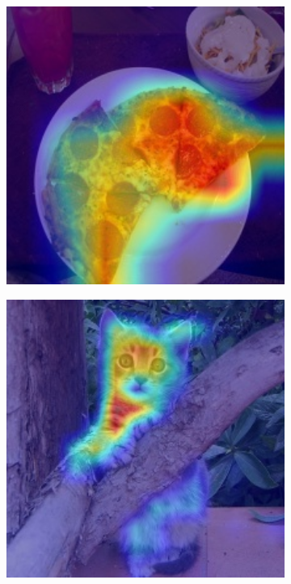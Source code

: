 \begin{figure}[t]
\begin{subfigure}[b]{0.19\textwidth}
        \includegraphics[width=1\textwidth]{figures/qualitative_results/ILSVRC2012_val_00018461_resnet50.JPEG}
    \end{subfigure}  
    \begin{subfigure}[b]{0.19\textwidth}
        \centering
        \includegraphics[width=1\textwidth]{figures/qualitative_results/ILSVRC2012_val_00023779_deit_small_patch16_224.JPEG}

\end{subfigure}
\end{figure}
